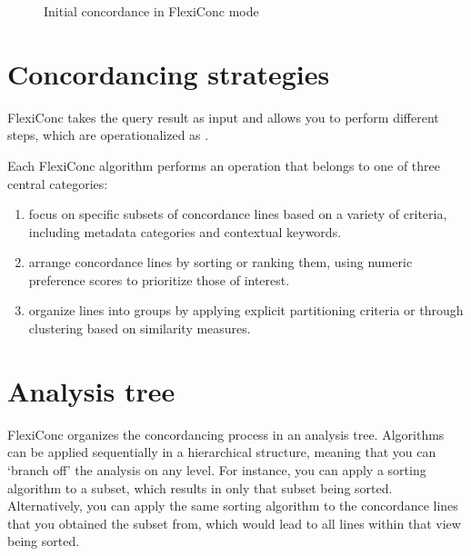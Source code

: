 \documentclass[letterpaper,10pt,english]{sphinxmanual}
\begin{document}
\begin{figure}[htbp]
\centering
\capstart

\noindent{}
\caption{Initial concordance in FlexiConc mode}\label{\detokenize{clicanalysis/flexiconc:id3}}\label{\detokenize{clicanalysis/flexiconc:flexiclic-first-result}}\end{figure}


\section{Concordancing strategies}
\label{\detokenize{clicanalysis/flexiconc:concordancing-strategies}}
\sphinxAtStartPar
FlexiConc takes the query result as input and allows you to perform
different steps, which are operationalized as .

\sphinxAtStartPar
Each FlexiConc algorithm performs an operation that belongs to one of
three central categories:
\begin{enumerate}
%
\item {} 
\sphinxAtStartPar
{} \textendash{} focus on specific subsets of concordance lines based
on a variety of criteria, including metadata categories and contextual
keywords.

\item {} 
\sphinxAtStartPar
{} \textendash{} arrange concordance lines by sorting or ranking them,
using numeric preference scores to prioritize those of interest.

\item {} 
\sphinxAtStartPar
{} \textendash{} organize lines into groups by applying explicit
partitioning criteria or through clustering based on similarity
measures.

\end{enumerate}


\section{Analysis tree}
\label{\detokenize{clicanalysis/flexiconc:analysis-tree}}
\sphinxAtStartPar
FlexiConc organizes the concordancing process in an analysis tree.
Algorithms can be applied sequentially in a hierarchical structure,
meaning that you can ‘branch off’ the analysis on any level. For
instance, you can apply a sorting algorithm to a subset, which results
in only that subset being sorted. Alternatively, you can apply the same
sorting algorithm to the concordance lines that you obtained the subset
from, which would lead to all lines within that view being sorted.
\end{document}
